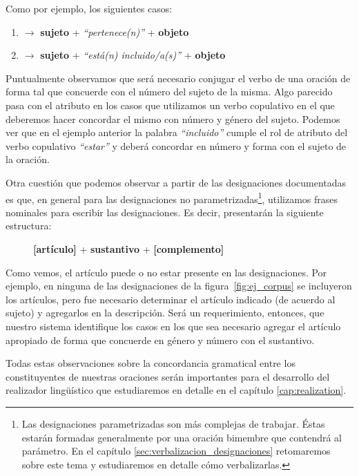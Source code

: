 \noindent
Como por ejemplo, los siguientes casos:

\bigskip
\begin{enumerate}
 \item {} $\rightarrow$ \textbf{sujeto} + \emph{``pertenece(n)''} + \textbf{objeto}
 \item {} $\rightarrow$ \textbf{sujeto} + \emph{``está(n) incluido/a(s)''} + \textbf{objeto}
\end{enumerate}

\bigskip
Puntualmente observamos que será necesario conjugar el verbo de una oración de forma tal que concuerde con el número del sujeto de la misma. Algo parecido pasa con el atributo en los casos que utilizamos un verbo copulativo en el que deberemos hacer concordar el mismo con número y género del sujeto. Podemos ver que en el ejemplo anterior la palabra \emph{``incluido''} cumple el rol de atributo del verbo copulativo \emph{``estar''} y deberá concordar en número y forma con el sujeto de la oración. 


Otra cuestión que podemos observar a partir de las designaciones documentadas es que, en general para las designaciones no parametrizadas\footnote{Las designaciones parametrizadas son más complejas de trabajar. Éstas estarán formadas generalmente por una oración bimembre que contendrá al parámetro. En el capítulo \ref{sec:verbalizacion_designaciones} retomaremos sobre este tema y estudiaremos en detalle cómo verbalizarlas.}, utilizamos frases nominales para escribir las designaciones. Es decir, presentarán la siguiente estructura:

\begin{figure}[H]
\center
\textbf{[artículo]} + \textbf{sustantivo} + \textbf{[complemento]}
\end{figure}

Como vemos, el artículo puede o no estar presente en las designaciones. Por ejemplo, en ninguna de las designaciones de la figura~\ref{fig:ej_corpus} se incluyeron los artículos, pero fue necesario determinar el artículo indicado (de acuerdo al sujeto) y agregarlos en la descripción. Será un requerimiento, entonces, que nuestro sistema identifique los casos en los que sea necesario agregar el artículo apropiado de forma que concuerde en género y número con el sustantivo. 

Todas estas observaciones sobre la concordancia gramatical entre los constituyentes de nuestras oraciones serán importantes para el desarrollo del realizador lingüístico que estudiaremos en detalle en el capítulo \ref{cap:realization}.

